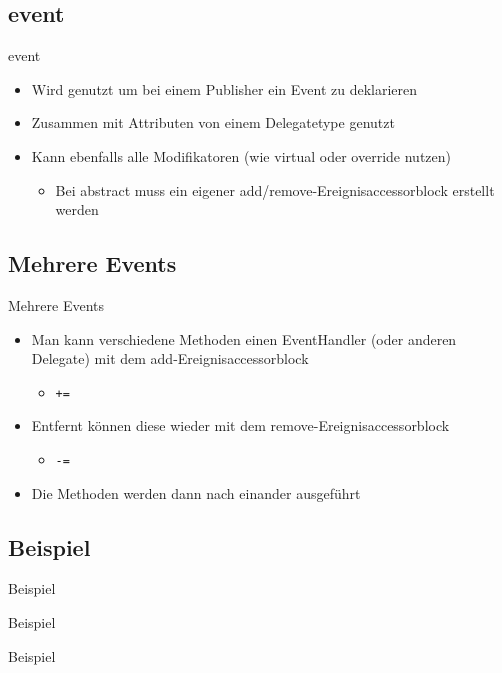 \subsection{event}
\begin{frame}{event}
	\begin{itemize}
		\item Wird genutzt um bei einem Publisher ein Event zu deklarieren
		\item Zusammen mit Attributen von einem Delegatetype genutzt
		\item Kann ebenfalls alle Modifikatoren (wie \alert{virtual} oder \alert{override} nutzen)
		\begin{itemize}
			\item Bei \alert{abstract} muss ein eigener add/remove-Ereignisaccessorblock erstellt werden
		\end{itemize}
	\end{itemize}				
	
\end{frame}

\subsection{Mehrere Events}
\begin{frame}{Mehrere Events}
	\begin{itemize}
		\item Man kann verschiedene Methoden einen EventHandler (oder anderen \alert{Delegate}) mit dem add-Ereignisaccessorblock
			\begin{itemize}
				\item \texttt{\alert{+=}}
			\end{itemize}
		\item Entfernt können diese wieder mit dem remove-Ereignisaccessorblock
			\begin{itemize}
				\item \texttt{\alert{-=}}
			\end{itemize}		
		\item Die Methoden werden dann nach einander ausgeführt
	\end{itemize}
\end{frame}

\subsection{Beispiel}
\begin{frame}{Beispiel}
	
\end{frame}

\begin{frame}{Beispiel}
	
\end{frame}

\begin{frame}{Beispiel}
	
\end{frame}



